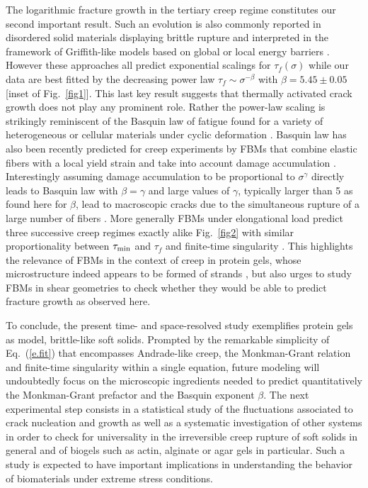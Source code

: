 \documentclass[twocolumn,superscriptaddress,showpacs,preprintnumbers,amsmath,amssymb,prl]{revtex4}
\begin{document}
The logarithmic fracture growth in the tertiary creep regime constitutes our second important result. Such an evolution is also commonly reported in disordered solid materials displaying brittle rupture and interpreted in the framework of Griffith-like models based on global or local energy barriers \cite{Vanel:2009}. However these approaches all predict exponential scalings for $\tau_f(\sigma)$ while our data are best fitted by the decreasing power law $\tau_f \sim \sigma^{-\beta}$ with $\beta=5.45\pm 0.05$ [inset of Fig.~\ref{fig1}]. This last key result suggests that thermally activated crack growth does not play any prominent role. Rather the power-law scaling is strikingly reminiscent of the Basquin law of fatigue found for a variety of heterogeneous or cellular materials under cyclic deformation \cite{Kun:2007,Basquin:1910,Kohout:2000}. Basquin law has also been recently predicted for creep experiments by FBMs that combine elastic fibers with a local yield strain and take into account damage accumulation \cite{Kun:2007,Halasz:2012}. Interestingly assuming damage accumulation to be proportional to $\sigma^\gamma$ directly leads to Basquin law with $\beta=\gamma$ and large values of $\gamma$, typically larger than 5 as found here for $\beta$, lead to macroscopic cracks due to the simultaneous rupture of a large number of fibers \cite{Halasz:2012}. More generally FBMs under elongational load predict three successive creep regimes exactly alike Fig.~\ref{fig2} with similar proportionality between $\tau_{\rm min}$ and $\tau_f$ and finite-time singularity \cite{Nechad:2005,Jagla:2011}. This highlights the relevance of FBMs in the context of creep in protein gels, whose microstructure indeed appears to be formed of strands \cite{Kalab:1983,Roefs:1990}, but also urges to study FBMs in shear geometries to check whether they would be able to predict fracture growth as observed here.

To conclude, the present time- and space-resolved study exemplifies protein gels as model, brittle-like soft solids. Prompted by the remarkable simplicity of Eq.~(\ref{e.fit}) that encompasses Andrade-like creep, the Monkman-Grant relation and finite-time singularity within a single equation, future modeling will undoubtedly focus on the microscopic ingredients needed to predict quantitatively the Monkman-Grant prefactor and the Basquin exponent $\beta$. The next experimental step consists in a statistical study of the fluctuations associated to crack nucleation and growth as well as a systematic investigation of other systems in order to check for universality in the irreversible creep rupture of soft solids in general and of biogels such as actin, alginate or agar gels in particular. Such a study is expected to have important implications in understanding the behavior of biomaterials under extreme stress conditions.
\end{document}
